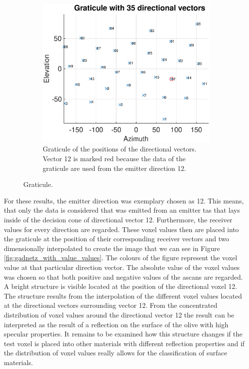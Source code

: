 \begin{figure}[H]
\begin{subfigure}[b]{0.77\textwidth}
         \includegraphics[width=1.09\linewidth]{Graphics/Results/gradnetz/graticule_35_vectors_emitter_12_active.eps}
         \caption{Graticule of the positions of the directional vectors. Vector 12 is marked red because the data of the graticule are used from the emitter direction 12.  }
         \label{fig:gadnetz_with_value_vecotrs}
     \end{subfigure}
        \caption{Graticule.}
        \label{fig:gadnetz_with_values}
\end{figure}




For these results, the emitter direction was exemplary chosen as 12. This means, that only the data is considered that was emitted from an emitter \ac{tas} that lays inside of the decision cone of directional vector 12. Furthermore, the receiver values for every direction are regarded. These voxel values then are placed into the graticule at the position of their corresponding receiver vectors and two dimensionally interpolated to create the image that we can see in Figure \ref{fig:gadnetz_with_value_values}. The colours of the figure represent the voxel value at that particular direction vector. The absolute value of the voxel values was chosen so that both positive and negative values of the \acp{ascan} are regarded. A bright structure is visible located at the position of the directional voxel 12. The structure results from the interpolation of the different voxel values located at the directional vectors surrounding vector 12. From the concentrated distribution of voxel values around the directional vector 12 the result can be interpreted as the result of a reflection on the surface of the olive with high specular properties. It remains to be examined how this structure changes if the test voxel is placed into other materials with different reflection properties and if the distribution of voxel values really allows for the classification of surface materials.  






